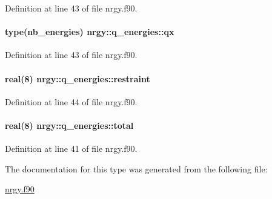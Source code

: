 Definition at line 43 of file nrgy.\-f90.

\hypertarget{structnrgy_1_1q__energies_a363f45711811f2655262a4969097cbbc}{
\paragraph[{qx}]{\setlength{\rightskip}{0pt plus 5cm}type({\bf nb\-\_\-energies}) nrgy\-::q\-\_\-energies\-::qx}}\label{structnrgy_1_1q__energies_a363f45711811f2655262a4969097cbbc}


Definition at line 43 of file nrgy.\-f90.

\hypertarget{structnrgy_1_1q__energies_a858c54d5eb6587a0f254c7979701a27b}{
\paragraph[{restraint}]{\setlength{\rightskip}{0pt plus 5cm}real(8) nrgy\-::q\-\_\-energies\-::restraint}}\label{structnrgy_1_1q__energies_a858c54d5eb6587a0f254c7979701a27b}


Definition at line 44 of file nrgy.\-f90.

\hypertarget{structnrgy_1_1q__energies_a063e4eff4f4042b322606d5dcfb8b1d8}{
\paragraph[{total}]{\setlength{\rightskip}{0pt plus 5cm}real(8) nrgy\-::q\-\_\-energies\-::total}}\label{structnrgy_1_1q__energies_a063e4eff4f4042b322606d5dcfb8b1d8}


Definition at line 41 of file nrgy.\-f90.



The documentation for this type was generated from the following file\-:\begin{DoxyCompactItemize}
\item 
\hyperlink{nrgy_8f90}{nrgy.\-f90}\end{DoxyCompactItemize}
